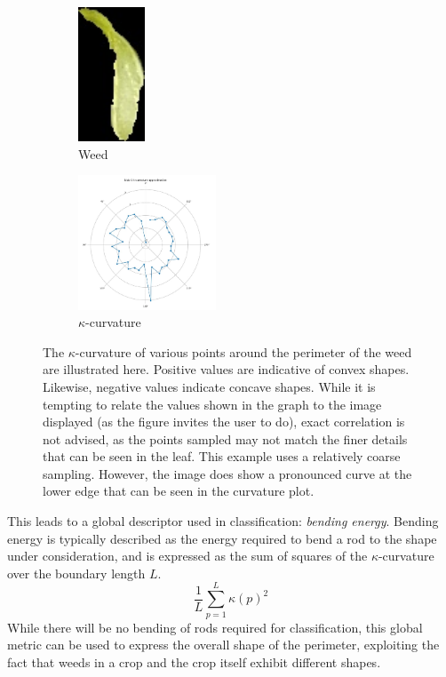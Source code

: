 \documentclass[letterpaper]{article}
\begin{document}
{{  \begin{figure}[h!]
	\centering
	\begin{subfigure}[h]{.4\textwidth}
	  \centering
	  \includegraphics[height=4cm]{./figures/for-curvature-blob-1.jpg}
	  \caption{Weed}
	  \label{fig:curvature-weed}
	\end{subfigure}
	\begin{subfigure}[h]{.4\textwidth}
	  \centering
	  \includegraphics[height=4cm]{./figures/curvature-blob-1.jpg}
	  \caption{$\kappa$-curvature}
	  \label{fig:curvature-plot}
	\end{subfigure}
	\caption[Example of $\kappa$-curvature]{The $\kappa$-curvature of various points around the perimeter of the weed are illustrated here. Positive values are indicative of convex shapes. Likewise, negative values indicate concave shapes.  While it is tempting to relate the values shown in the graph to the image displayed (as the figure invites the user to do), exact correlation is not advised, as the points sampled may not match the finer details that can be seen in the leaf. This example uses a relatively coarse sampling. However, the image does show a pronounced curve at the lower edge that can be seen in the curvature plot.}
	\label{fig:curvature}
\end{figure}
This leads to a global descriptor used in classification: \textit{bending energy}. Bending energy is typically described as the energy required to bend a rod to the shape under consideration, and is expressed as the sum of squares of the $\kappa$-curvature over the boundary length $L$.
\begin{equation}
\frac{1}{L} \sum_{p=1}^{L}\kappa(p)^2
\end{equation}
While there will be no bending of rods required for classification, this global metric can be used to express the overall shape of the perimeter, exploiting the fact that weeds in a crop and the crop itself exhibit different shapes.

}}
\end{document}
